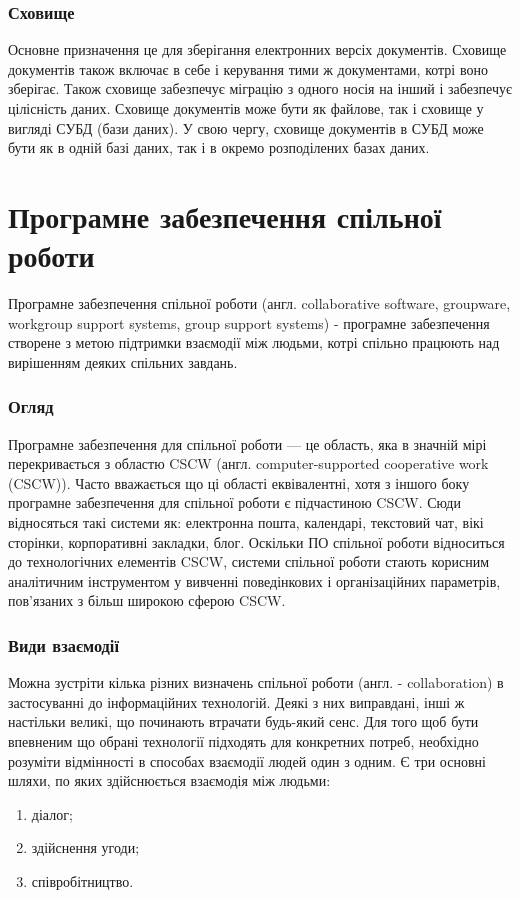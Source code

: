 \subsubsection{Сховище}
Основне призначення це для зберігання електронних версіх документів. 
Сховище документів також включає в себе і керування тими ж документами, котрі воно зберігає.
Також сховище забезпечує міграцію з одного носія на інший і забезпечує цілісність даних.
Сховище документів може бути як файлове, так і сховище у вигляді СУБД (бази даних). 
У свою чергу, сховище документів в СУБД може бути як в одній базі даних, так і в окремо розподілених базах даних.
        

\section{Програмне забезпечення спільної роботи}
Програмне забезпечення спільної роботи (англ. collaborative software, groupware, workgroup support systems, group support systems) - програмне забезпечення створене з метою підтримки взаємодії між людьми, котрі спільно працюють над вирішенням деяких спільних завдань. 

\subsubsection{Огляд}
Програмне забезпечення для спільної роботи --- це область, яка в значній мірі перекривається з областю CSCW (англ. computer-supported cooperative work (CSCW)).
Часто вважається що ці області еквівалентні, хотя з іншого боку програмне забезпечення для спільної роботи є підчастиною CSCW.
Сюди відносяться такі системи як: електронна пошта, календарі, текстовий чат, вікі сторінки, корпоративні закладки, блог.
Оскільки ПО спільної роботи відноситься до технологічних елементів CSCW, системи спільної роботи стають корисним аналітичним інструментом у вивченні поведінкових і організаційних параметрів, пов'язаних з більш широкою сферою CSCW.

\subsubsection{Види взаємодії}
Можна зустріти кілька різних визначень спільної роботи (англ. - collaboration) в застосуванні до інформаційних технологій. Деякі з них виправдані, інші ж настільки великі, що починають втрачати будь-який сенс.
Для того щоб бути впевненим що обрані технології підходять для конкретних потреб, необхідно розуміти відмінності в способах взаємодії людей один з одним.
Є три основні шляхи, по яких здійснюється взаємодія між людьми: 
\begin{enumerate}
\item діалог;
\item здійснення угоди;
\item співробітництво.
\end{enumerate}

